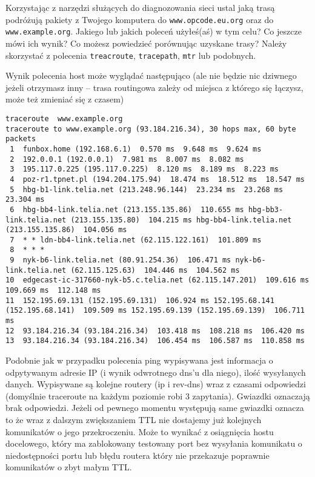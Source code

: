 \dbEntryCheckResults
Korzystając z narzędzi służących do diagnozowania sieci ustal jaką trasą podróżują pakiety z Twojego komputera do \Verb#www.opcode.eu.org# oraz do \Verb#www.example.org#.
Jakiego lub jakich poleceń użyłeś(aś) w tym celu? Co jeszcze mówi ich wynik? Co możesz powiedzieć porównując uzyskane trasy?
\fi
{}\dbEntryCheckResults
Należy skorzystać z polecenia \Verb#treacroute#, \Verb#tracepath#, \Verb#mtr# lub podobnych.

Wynik polecenia host może wyglądać następująco (ale nie będzie nic dziwnego jeżeli otrzymasz inny – trasa routingowa zależy od miejsca z którego się łączysz, może też zmieniać się z czasem)
\begin{Verbatim}
traceroute  www.example.org
traceroute to www.example.org (93.184.216.34), 30 hops max, 60 byte packets
 1  funbox.home (192.168.6.1)  0.570 ms  9.648 ms  9.624 ms
 2  192.0.0.1 (192.0.0.1)  7.981 ms  8.007 ms  8.082 ms
 3  195.117.0.225 (195.117.0.225)  8.120 ms  8.189 ms  8.223 ms
 4  poz-r1.tpnet.pl (194.204.175.94)  18.474 ms  18.512 ms  18.547 ms
 5  hbg-b1-link.telia.net (213.248.96.144)  23.234 ms  23.268 ms  23.304 ms
 6  hbg-bb4-link.telia.net (213.155.135.86)  110.655 ms hbg-bb3-link.telia.net (213.155.135.80)  104.215 ms hbg-bb4-link.telia.net (213.155.135.86)  104.056 ms
 7  * * ldn-bb4-link.telia.net (62.115.122.161)  101.809 ms
 8  * * *
 9  nyk-b6-link.telia.net (80.91.254.36)  106.471 ms nyk-b6-link.telia.net (62.115.125.63)  104.446 ms  104.562 ms
10  edgecast-ic-317660-nyk-b5.c.telia.net (62.115.147.201)  109.616 ms  109.669 ms  112.148 ms
11  152.195.69.131 (152.195.69.131)  106.924 ms 152.195.68.141 (152.195.68.141)  109.509 ms 152.195.69.139 (152.195.69.139)  106.711 ms
12  93.184.216.34 (93.184.216.34)  103.418 ms  108.218 ms  106.420 ms
13  93.184.216.34 (93.184.216.34)  106.454 ms  106.587 ms  110.858 ms
\end{Verbatim}

Podobnie jak w przypadku polecenia ping wypisywana jest informacja o odpytywanym adresie IP (i wynik odwrotnego dns'u dla niego), ilość wysyłanych danych.
Wypisywane są kolejne routery (ip i rev-dns) wraz z czasami odpowiedzi (domyślnie traceroute na każdym poziomie robi 3 zapytania).
Gwiazdki oznaczają brak odpowiedzi. Jeżeli od pewnego momentu występują same gwiazdki oznacza to że wraz z dalszym zwiększaniem TTL nie dostajemy już kolejnych komunikatów o jego przekroczeniu.
	Może to wynikać z osiągnięcia hostu docelowego, który ma zablokowany testowany port bez wysyłania komunikatu o niedostępności portu lub błędu routera który nie przekazuje poprawnie komunikatów o zbyt małym TTL.
\fi



